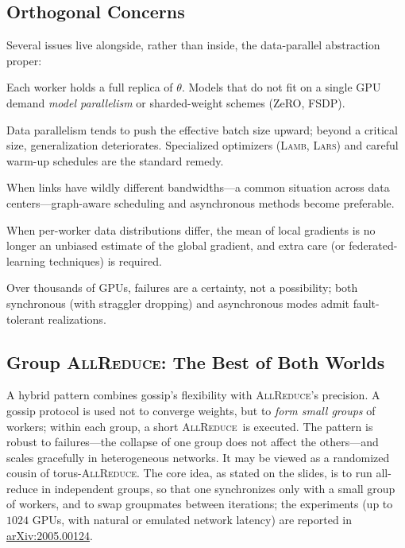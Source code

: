 \documentclass[11pt,a4paper]{article}
\theoremstyle{definition}
\theoremstyle{remark}
\theoremstyle{plain}
\newcommand{\allreduce}{\textsc{AllReduce}}
\begin{document}
\subsection{Orthogonal Concerns}

Several issues live alongside, rather than inside, the data-parallel
abstraction proper:

\begin{description}[leftmargin=1.5em, style=nextline]
  \item[Memory constraints.] Each worker holds a full replica of $\theta$.
    Models that do not fit on a single GPU demand \emph{model
    parallelism} or sharded-weight schemes (ZeRO, FSDP).
  \item[Large-batch generalization.] Data parallelism tends to push the
    effective batch size upward; beyond a critical size, generalization
    deteriorates. Specialized optimizers (\textsc{Lamb}, \textsc{Lars})
    and careful warm-up schedules are the standard remedy.
  \item[Heterogeneous networks.] When links have wildly different
    bandwidths---a common situation across data centers---graph-aware
    scheduling and asynchronous methods become preferable.
  \item[Non-IID data.] When per-worker data distributions differ, the mean
    of local gradients is no longer an unbiased estimate of the global
    gradient, and extra care (or federated-learning techniques) is
    required.
  \item[Fault tolerance.] Over thousands of GPUs, failures are a
    certainty, not a possibility; both synchronous (with straggler
    dropping) and asynchronous modes admit fault-tolerant realizations.
\end{description}

\subsection{Group \allreduce: The Best of Both Worlds}

A hybrid pattern combines gossip's flexibility with \allreduce's
precision. A gossip protocol is used not to converge weights, but to
\emph{form small groups} of workers; within each group, a short
\allreduce\ is executed. The pattern is robust to failures---the collapse
of one group does not affect the others---and scales gracefully in
heterogeneous networks. It may be viewed as a randomized cousin of
torus-\allreduce. The core idea, as stated on the slides, is to run
all-reduce in independent groups, so that one synchronizes only with a
small group of workers, and to swap groupmates between iterations; the
experiments (up to $1024$ GPUs, with natural or emulated network latency)
are reported in
\href{https://arxiv.org/abs/2005.00124}{arXiv:2005.00124}.
\end{document}
